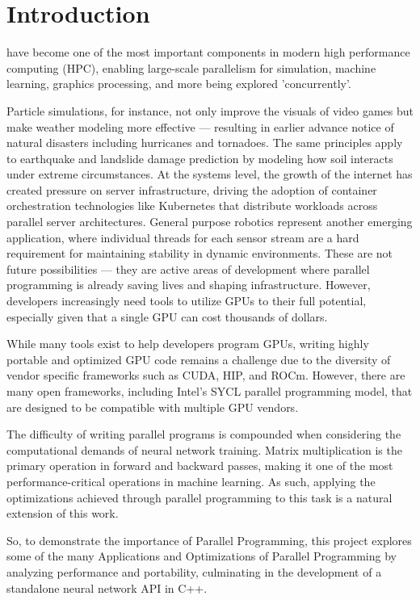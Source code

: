 \documentclass[journal]{IEEEtran}
\begin{document}
\section{Introduction}
 have become one of the most important components in modern high performance computing (HPC), enabling large-scale parallelism for simulation, machine learning, graphics processing, and more being explored 'concurrently'. 
\par Particle simulations, for instance, not only improve the visuals of video games but make weather modeling more effective — resulting in earlier advance notice of natural disasters including hurricanes and tornadoes. The same principles apply to earthquake and landslide damage prediction by modeling how soil interacts under extreme circumstances. At the systems level, the growth of the internet has created pressure on server infrastructure, driving the adoption of container orchestration technologies like Kubernetes that distribute workloads across parallel server architectures. General purpose robotics represent another emerging application, where individual threads for each sensor stream are a hard requirement for maintaining stability in dynamic environments. These are not future possibilities — they are active areas of development where parallel programming is already saving lives and shaping infrastructure. However, developers increasingly need tools to utilize GPUs to their full potential, especially given that a single GPU can cost thousands of dollars.
\par While many tools exist to help developers program GPUs, writing highly portable and optimized GPU code remains a challenge due to the diversity of vendor specific frameworks such as CUDA, HIP, and ROCm. However, there are many open frameworks, including Intel's SYCL parallel programming model, that are designed to be compatible with multiple GPU vendors. 
\par The difficulty of writing parallel programs is compounded when considering the computational demands of neural network training. Matrix multiplication is the primary operation in forward and backward passes, making it one of the most performance-critical operations in machine learning. As such, applying the optimizations achieved through parallel programming to this task is a natural extension of this work. 
\par So, to demonstrate the importance of Parallel Programming, this project explores some of the many Applications and Optimizations of Parallel Programming by analyzing performance and portability, culminating in the development of a standalone neural network API in C++.
\end{document}
